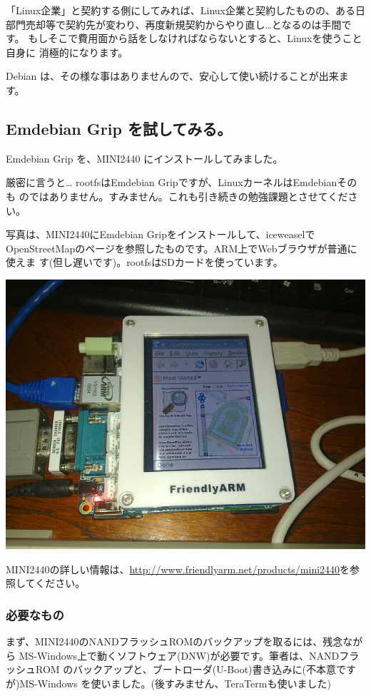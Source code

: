 \documentclass[mingoth,a4paper]{jsarticle}
\begin{document}
「Linux企業」と契約する側にしてみれば、Linux企業と契約したものの、ある日
部門売却等で契約先が変わり、再度新規契約からやり直し…となるのは手間です。
もしそこで費用面から話をしなければならないとすると、Linuxを使うこと自身に
消極的になります。

Debian は、その様な事はありませんので、安心して使い続けることが出来ます。

\subsection{Emdebian Grip を試してみる。}

Emdebian Grip を、MINI2440 にインストールしてみました。

厳密に言うと… rootfsはEmdebian Gripですが、LinuxカーネルはEmdebianそのも
のではありません。すみません。これも引き続きの勉強課題とさせてください。

写真は、MINI2440にEmdebian Gripをインストールして、iceweaselで
OpenStreetMapのページを参照したものです。ARM上でWebブラウザが普通に使えま
す(但し遅いです)。rootfsはSDカードを使っています。

\begin{center}
 \includegraphics[width=0.8\hsize]{image201008/emdebian.jpg}
\end{center}

MINI2440の詳しい情報は、\url{http://www.friendlyarm.net/products/mini2440}を参照してください。

\subsubsection{必要なもの}

まず、MINI2440のNANDフラッシュROMのバックアップを取るには、残念ながら
MS-Windows上で動くソフトウェア(DNW)が必要です。筆者は、NANDフラッシュROM
のバックアップと、ブートローダ(U-Boot)書き込みに(不本意ですが)MS-Windows
を使いました。(後すみません、TeraTermも使いました)
\end{document}
